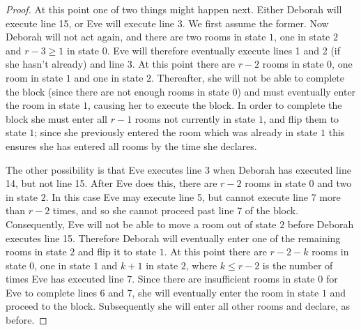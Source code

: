 \documentclass[a4paper,11pt]{extarticle}
\theoremstyle{definition}
\theoremstyle{remark}
\begin{document}
\begin{proof}
		At this point one of two things might happen next. Either Deborah will execute line 15, or Eve will execute line 3. We first assume the former. Now Deborah will not act again, and there are two rooms in state $1$, one in state $2$ and $r-3\geq 1$ in state $0$. Eve will therefore eventually execute lines 1 and 2 (if she hasn't already) and line 3. At this point there are $r-2$ rooms in state $0$, one room in state $1$ and one in state $2$.
		Thereafter, she will not be able to complete the \wotext block (since there are not enough rooms in state $0$) and must eventually enter the room in state $1$, causing her to execute the \eltext block. In order to complete the \eltext block she must enter all $r-1$ rooms not currently in state $1$, and flip them to state $1$; since she previously entered the room which was already in state $1$ this ensures she has entered all rooms by the time she declares.
		
		The other possibility is that Eve executes line 3 when Deborah has executed line 14, but not line 15. After Eve does this, there are $r-2$ rooms in state $0$ and two in state $2$. In this case Eve may execute line 5, but cannot execute line 7 more than $r-2$ times, and so she cannot proceed past line 7 of the \wotext block. Consequently, Eve will not be able to move a room out of state $2$ before Deborah executes line 15. Therefore Deborah will eventually enter one of the remaining rooms in state $2$ and flip it to state $1$. At this point there are $r-2-k$ rooms in state $0$, one in state $1$ and $k+1$ in state $2$, where $k\leq r-2$ is the number of times Eve has executed line 7. Since there are insufficient rooms in state $0$ for Eve to complete lines 6 and 7, she will eventually enter the room in state $1$ and proceed to the \eltext block. Subsequently she will enter all other rooms and declare, as before.
	\end{proof}
	
\end{document}
